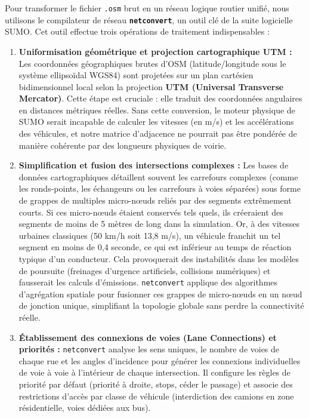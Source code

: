 \documentclass[10pt, a4paper]{article}
\begin{document}
Pour transformer le fichier \texttt{.osm} brut en un réseau logique
routier unifié, nous utilisons le compilateur de réseau
\textbf{\texttt{netconvert}}, un outil clé de la suite logicielle SUMO.
Cet outil effectue trois opérations de traitement indispensables :

\begin{enumerate}
\def\labelenumi{\arabic{enumi}.}
\item
  \textbf{Uniformisation géométrique et projection cartographique UTM :}
  Les coordonnées géographiques brutes d'OSM (latitude/longitude sous le
  système ellipsoïdal WGS84) sont projetées sur un plan cartésien
  bidimensionnel local selon la projection \textbf{UTM (Universal
  Transverse Mercator)}. Cette étape est cruciale : elle traduit des
  coordonnées angulaires en distances métriques réelles. Sans cette
  conversion, le moteur physique de SUMO serait incapable de calculer
  les vitesses (en m/s) et les accélérations des véhicules, et notre
  matrice d'adjacence ne pourrait pas être pondérée de manière cohérente
  par des longueurs physiques de voirie.
\item
  \textbf{Simplification et fusion des intersections complexes :} Les
  bases de données cartographiques détaillent souvent les carrefours
  complexes (comme les ronds-points, les échangeurs ou les carrefours à
  voies séparées) sous forme de grappes de multiples micro-nœuds reliés
  par des segments extrêmement courts. Si ces micro-nœuds étaient
  conservés tels quels, ils créeraient des segments de moins de 5 mètres
  de long dans la simulation. Or, à des vitesses urbaines classiques (50
  km/h soit 13,8 m/s), un véhicule franchit un tel segment en moins de
  0,4 seconde, ce qui est inférieur au temps de réaction typique d'un
  conducteur. Cela provoquerait des instabilités dans les modèles de
  poursuite (freinages d'urgence artificiels, collisions numériques) et
  fausserait les calculs d'émissions. \texttt{netconvert} applique des
  algorithmes d'agrégation spatiale pour fusionner ces grappes de
  micro-nœuds en un nœud de jonction unique, simplifiant la topologie
  globale sans perdre la connectivité réelle.
\item
  \textbf{Établissement des connexions de voies (Lane Connections) et
  priorités :} \texttt{netconvert} analyse les sens uniques, le nombre
  de voies de chaque rue et les angles d'incidence pour générer les
  connexions individuelles de voie à voie à l'intérieur de chaque
  intersection. Il configure les règles de priorité par défaut (priorité
  à droite, stops, céder le passage) et associe des restrictions d'accès
  par classe de véhicule (interdiction des camions en zone
  résidentielle, voies dédiées aux bus).
\end{enumerate}
\end{document}
